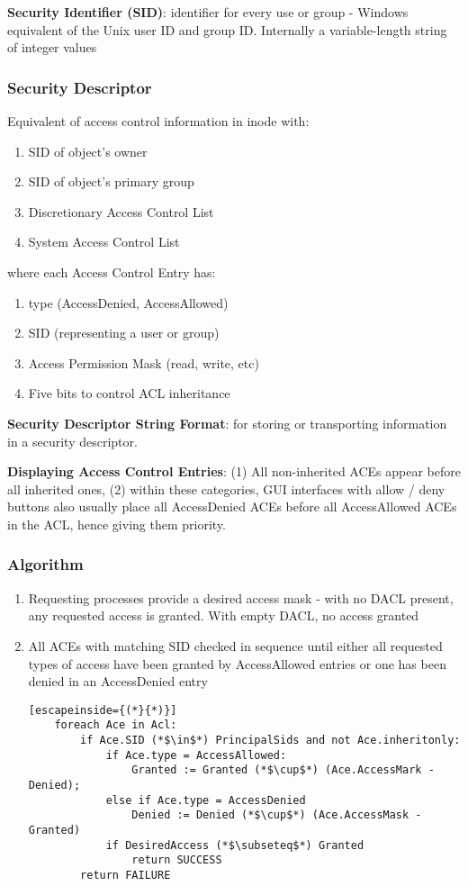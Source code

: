 \documentclass{article}
\begin{document}
\noindent
\textbf{Security Identifier (SID)}: identifier for every use or group - Windows equivalent of the Unix user ID and group ID. Internally a variable-length string of integer values

\bigskip
\noindent
\subsubsection{Security Descriptor}
Equivalent of access control information in inode with:
\begin{enumerate}
	\item SID of object's owner
	\item SID of object's primary group
	\item Discretionary Access Control List
	\item System Access Control List
\end{enumerate}
where each Access Control Entry has:
\begin{enumerate}
	\item type (AccessDenied, AccessAllowed)
	\item SID (representing a user or group)
	\item Access Permission Mask (read, write, etc)
	\item Five bits to control ACL inheritance
\end{enumerate}

\noindent
\textbf{Security Descriptor String Format}: for storing or transporting information in a security descriptor. 

\bigskip
\noindent
\textbf{Displaying Access Control Entries}: (1) All non-inherited ACEs appear before all inherited ones, (2) within these categories, GUI interfaces with allow / deny buttons also usually place all AccessDenied ACEs before all AccessAllowed ACEs in the ACL, hence giving them priority.

\subsubsection{Algorithm}
\begin{enumerate}
	\item Requesting processes provide a desired access mask - with no DACL present, any requested access is granted. With empty DACL, no access granted
	\item All ACEs with matching SID checked in sequence until either all requested types of access have been granted by AccessAllowed entries or one has been denied in an AccessDenied entry
	
	\begin{lstlisting}[escapeinside={(*}{*)}]
	foreach Ace in Acl:
		if Ace.SID (*$\in$*) PrincipalSids and not Ace.inheritonly:
			if Ace.type = AccessAllowed:
				Granted := Granted (*$\cup$*) (Ace.AccessMark - Denied);
			else if Ace.type = AccessDenied
				Denied := Denied (*$\cup$*) (Ace.AccessMask - Granted)
			if DesiredAccess (*$\subseteq$*) Granted
				return SUCCESS
		return FAILURE
	\end{lstlisting}
\end{enumerate}
\end{document}
